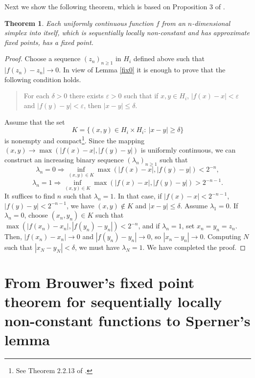 \documentclass[reqno]{amsart}
\newtheorem{thm}{Theorem}
\begin{document}
Next we show the following theorem, which is based on Proposition 3 of \cite{berg}.
\begin{thm}
Each uniformly continuous function $f$ from an $n$-dimensional simplex into itself, which is sequentially locally non-constant and has approximate fixed points, has a fixed point.
\end{thm}
\begin{proof}
Choose a sequence $(z_n)_{n\geq 1}$ in $H_i$ defined above such that $|f(z_n)-z_n|\longrightarrow 0$. In view of Lemma \ref{fix0} it is enough to prove that the following condition holds.
\begin{quote}
For each $\delta>0$ there exists $\varepsilon>0$ such that if $x, y\in H_i$, $|f(x)-x|<\varepsilon$ and $|f(y)-y|<\varepsilon$, then $|x-y|\leq \delta$.
\end{quote}
Assume that the set
\[K=\{(x,y)\in H_i\times H_i:\ |x-y|\geq \delta\}\]
is nonempty and compact\footnote{See Theorem 2.2.13 of \cite{bv}.}. Since the mapping $(x,y)\longrightarrow \max(|f(x)-x|,|f(y)-y|)$ is uniformly continuous, we can construct an increasing binary sequence $(\lambda_n)_{n\geq 1}$ such that
\[\lambda_n=0\Rightarrow \inf_{(x,y)\in K}\max(|f(x)-x|,|f(y)-y|)<2^{-n},\]
\[\lambda_n=1\Rightarrow \inf_{(x,y)\in K}\max(|f(x)-x|,|f(y)-y|)>2^{-n-1}.\]
It suffices to find $n$ such that $\lambda_n=1$. In that case, if $|f(x)-x|<2^{-n-1}$, $|f(y)-y|<2^{-n-1}$, we have $(x,y)\notin K$ and $|x-y|\leq \delta$. Assume $\lambda_1=0$. If $\lambda_n=0$, choose $(x_n, y_n)\in K$ such that $\max(|f(x_n)-x_n|, |f(y_n)-y_n|)<2^{-n}$, and if $\lambda_n=1$, set $x_n=y_n=z_n$. Then, $|f(x_n)-x_n|\longrightarrow 0$ and $|f(y_n)-y_n|\longrightarrow 0$, so $|x_n-y_n|\longrightarrow 0$. Computing $N$ such that $|x_N-y_N|<\delta$, we must have $\lambda_N=1$. We have completed the proof.
\end{proof}

\section{From Brouwer's fixed point theorem for sequentially locally non-constant functions to Sperner's lemma}
\end{document}
